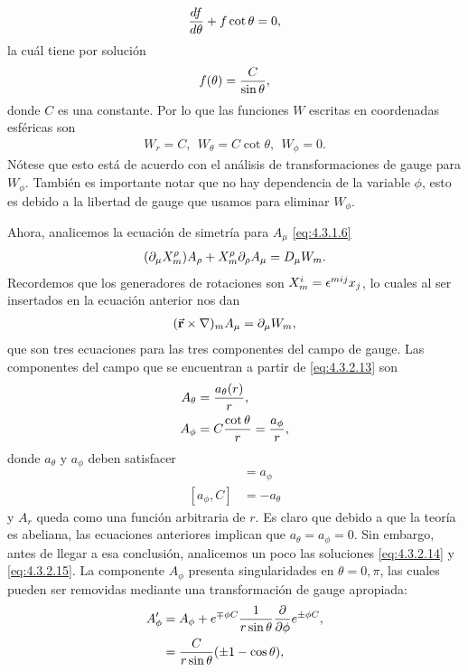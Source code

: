 \begin{align}
	\frac{df}{d\theta}+f\cot\theta=0, 
\end{align}
la cuál tiene por solución
\begin{align}
	f(\theta) = \frac{C}{\sin\theta},
\end{align}
donde $C$ es una constante. Por lo que las funciones $W$ escritas en coordenadas esféricas son
\begin{align}
	W_r = C, \ \ W_\theta = C\cot\theta, \ \ W_\phi=0.
\end{align}
Nótese que esto está de acuerdo con el análisis de transformaciones de gauge para $W_\phi$. También es importante notar que no hay dependencia de la variable $\phi$, esto es debido a la libertad de gauge que usamos para eliminar $W_\phi$.

Ahora, analicemos la ecuación de simetría para $A_\mu$ \eqref{eq:4.3.1.6}
\begin{align}
	(\partial_\mu X^\rho_m)A_\rho+X^\rho_m\partial_\rho A_\mu = D_\mu W_m.
\end{align}
Recordemos que los generadores de rotaciones son $X^i_m=\epsilon^{mij}x_j$, lo cuales al ser insertados en la ecuación anterior nos dan
\begin{align}
	(\vec{\mathbf{r}}\times\nabla)_m A_\mu = \partial_\mu W_m, \label{eq:4.3.2.13}
\end{align}
que son tres ecuaciones para las tres componentes del campo de gauge. Las componentes del campo que se encuentran a partir de \eqref{eq:4.3.2.13} son
\begin{align}
	A_\theta &=\frac{a_\theta(r)}{r}, \label{eq:4.3.2.14}\\
	A_\phi &= C\frac{\cot\theta}{r}=\frac{a_\phi}{r},\label{eq:4.3.2.15}
\end{align}
donde $a_\theta$ y $a_\phi$ deben satisfacer
\begin{align}
	[a_\theta,C] &=a_\phi\\
	[a_\phi,C]&=-a_\theta
\end{align}
y $A_r$ queda como una función arbitraria de $r$. Es claro que debido a que la teoría es abeliana, las ecuaciones anteriores implican que $a_\theta=a_\phi=0$. Sin embargo, antes de llegar a esa conclusión, analicemos un poco las soluciones \eqref{eq:4.3.2.14} y \eqref{eq:4.3.2.15}. La componente $A_\phi$ presenta singularidades en $\theta=0,\pi$, las cuales pueden ser removidas mediante una transformación de gauge apropiada:
\begin{align}\nonumber
	A_\phi' &= A_\phi+e^{\mp\phi C}\frac{1}{r\sin\theta}\frac{\partial}{\partial\phi}e^{\pm\phi C},\\
			&= \frac{C}{r\sin\theta}(\pm 1-\cos\theta),
\end{align}
